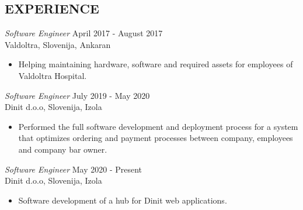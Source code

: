 \documentclass[margin, 10pt]{res} %
\begin{document}
\begin{resume}
\section{EXPERIENCE}

{\sl Software Engineer}  \hfill April 2017 - August 2017 \\ 
Valdoltra, Slovenija, Ankaran
\begin{itemize} 
\item Helping maintaining hardware, software and required assets for employees of Valdoltra Hospital.
\end{itemize} 

{\sl Software Engineer}  \hfill July 2019 - May 2020 \\ 
Dinit d.o.o, Slovenija, Izola
\begin{itemize} 
\item Performed the full software development and deployment process for a system that optimizes ordering and payment processes between company, employees and company bar owner.
\end{itemize} 

{\sl Software Engineer}  \hfill May 2020 - Present \\ 
Dinit d.o.o, Slovenija, Izola
\begin{itemize} 
\item Software development of a hub for Dinit web applications.
\end{itemize} 


\end{resume}
\end{document}
